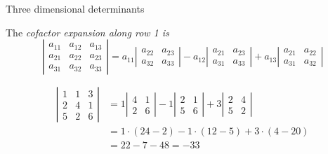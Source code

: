 \documentclass{beamer}
\begin{document}
\begin{frame}{Three dimensional determinants}
  \begin{definition}
    The \emph{cofactor expansion along row 1 is}
    \begin{equation*}
      \left|
	\begin{array}{ccc}
          a_{11}&a_{12}&a_{13}\\
          a_{21}&a_{22}&a_{23}\\
          a_{31}&a_{32}&a_{33}
	\end{array}
      \right| = a_{11} \left|
	\begin{array}{cc}
          a_{22}&a_{23}\\
          a_{32}&a_{33}
	\end{array}
      \right|-a_{12} \left|
	\begin{array}{cc}
          a_{21}&a_{23}\\
          a_{31}&a_{33}
	\end{array}
      \right|+a_{13} \left|
	\begin{array}{cc}
          a_{21}&a_{22}\\
          a_{31}&a_{32}
	\end{array}
      \right|
    \end{equation*}
  \end{definition}
  \begin{example}
    \begin{align*}
      \left|
	\begin{array}{ccc}
          1&1&3\\
          2&4&1\\
          5&2&6
	\end{array}
      \right| &= 1 \left|
	\begin{array}{cc}
          4&1\\
          2&6
	\end{array}
      \right| -1 \left|
	\begin{array}{cc}
          2&1\\
          5&6
	\end{array}
      \right|+3 \left|
	\begin{array}{cc}
          2&4\\
          5&2
	\end{array}
             \right|\\
           &= 1\cdot(24-2)-1\cdot(12-5)+3\cdot(4-20) \\
           &= 22-7-48 = -33
    \end{align*}
  \end{example}
\end{frame}
\end{document}
